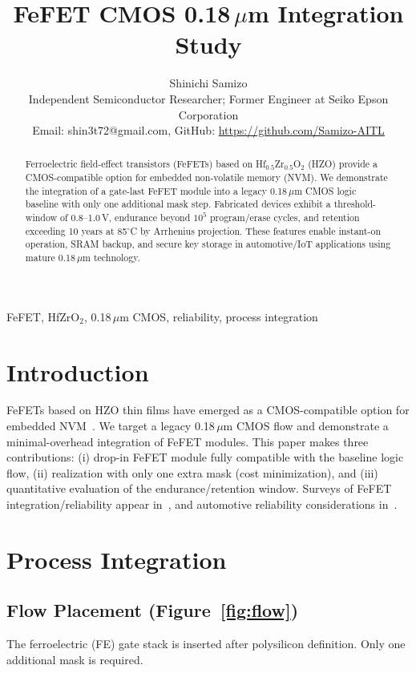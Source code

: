 \documentclass[conference]{IEEEtran}
\title{FeFET CMOS 0.18\,$\mu$m Integration Study}
\author{
Shinichi Samizo\\
Independent Semiconductor Researcher; Former Engineer at Seiko Epson Corporation\\
Email: shin3t72@gmail.com, GitHub: \url{https://github.com/Samizo-AITL}
}
\begin{document}
\maketitle

\begin{abstract}
Ferroelectric field-effect transistors (FeFETs) based on Hf$_{0.5}$Zr$_{0.5}$O$_2$ (HZO) provide a CMOS-compatible option for embedded non-volatile memory (NVM). We demonstrate the integration of a gate-last FeFET module into a legacy 0.18\,$\mu$m CMOS logic baseline with only one additional mask step. Fabricated devices exhibit a threshold-window of 0.8--1.0\,V, endurance beyond $10^5$ program/erase cycles, and retention exceeding 10 years at 85$^\circ$C by Arrhenius projection. These features enable instant-on operation, SRAM backup, and secure key storage in automotive/IoT applications using mature 0.18\,$\mu$m technology.
\end{abstract}

\begin{IEEEkeywords}
FeFET, HfZrO$_2$, 0.18\,$\mu$m CMOS, reliability, process integration
\end{IEEEkeywords}

\section{Introduction}
FeFETs based on HZO thin films have emerged as a CMOS-compatible option for embedded NVM~\cite{Boscke2011,Muller2012,Schenk2019}. We target a legacy 0.18\,$\mu$m CMOS flow and demonstrate a minimal-overhead integration of FeFET modules. This paper makes three contributions: (i) drop-in FeFET module fully compatible with the baseline logic flow, (ii) realization with only one extra mask (cost minimization), and (iii) quantitative evaluation of the endurance/retention window. Surveys of FeFET integration/reliability appear in~\cite{Mueller2015,Park2020}, and automotive reliability considerations in~\cite{Nakamura2003}.

\section{Process Integration}

\subsection{Flow Placement (Figure~\ref{fig:flow})}
The ferroelectric (FE) gate stack is inserted after polysilicon definition. Only one additional mask is required.
\end{document}
